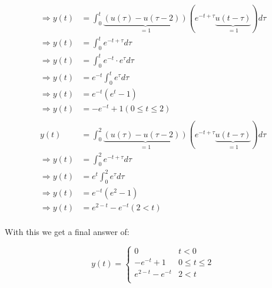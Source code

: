 \documentclass{article}
\begin{document}
\begin{enumerate}
\begin{align}
        \Rightarrow y(t) &= \int_{0}^{t} \underbrace{(u(\tau)-u(\tau-2))}_{=1}(e^{-t+\tau}\underbrace{u(t - \tau)}_{=1}) d\tau\\
        \Rightarrow y(t) &= \int_{0}^{t} e^{-t+\tau} d\tau\\
        \Rightarrow y(t) &= \int_{0}^{t} e^{-t}\cdot e^\tau d\tau\\
        \Rightarrow y(t) &= e^{-t} \int_{0}^{t}  e^\tau d\tau\\
        \Rightarrow y(t) &= e^{-t} (e^t - 1)\\
        \Rightarrow y(t) &= - e^{-t}+1 (0 \leq t \leq 2)\\
\end{align}
\begin{align}
        y(t) &= \int_{0}^{2} \underbrace{(u(\tau)-u(\tau-2))}_{=1}(e^{-t+\tau}\underbrace{u(t - \tau)}_{=1}) d\tau\\
        \Rightarrow y(t) &= \int_{0}^{2} e^{-t+\tau}d\tau\\
        \Rightarrow y(t) &= e^t \int_{0}^{2} e^{\tau}d\tau\\
        \Rightarrow y(t) &= e^{-t} (e^2-1)\\
        \Rightarrow y(t) &= e^{2-t}-e^{-t} (2 < t)\\
    \end{align}
    \begin{center}
        With this we get a final answer of:
    \end{center}
    \begin{equation}
        \boxed{y(t) = \begin{cases} 
          0 & t<0 \\
          - e^{-t}+1 & 0 \leq t \leq 2\\
          e^{2-t}-e^{-t} & 2 < t\\
               \end{cases}    }
    \end{equation}
    

\end{enumerate}
\end{document}
